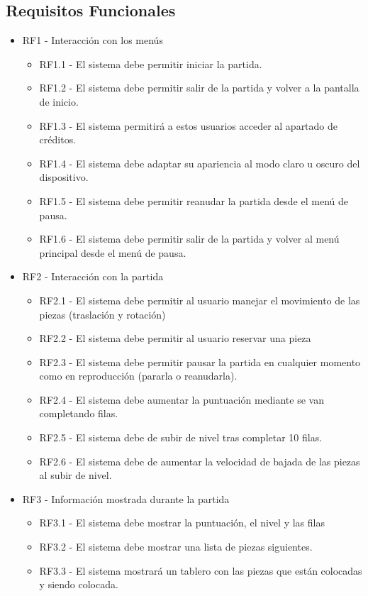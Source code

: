 \documentclass{article}
\begin{document}
\subsection {Requisitos Funcionales}
\begin{itemize}
    
    \item RF1 - Interacción con los menús  
    \begin{itemize}
      \item RF1.1 - El sistema debe permitir iniciar la partida.
      \item RF1.2 - El sistema debe permitir salir de la partida y volver a la pantalla de inicio.
      \item RF1.3 - El sistema permitirá a estos usuarios acceder al apartado de créditos. 
      \item RF1.4 - El sistema debe adaptar su apariencia al modo claro u oscuro del dispositivo.
      \item RF1.5 - El sistema debe permitir reanudar la partida desde el menú de pausa.
      \item RF1.6 - El sistema debe permitir salir de la partida y volver al menú principal desde el menú de pausa.
    \end{itemize}

    \item RF2 - Interacción con la partida
    \begin{itemize}
      \item RF2.1 - El sistema debe permitir al usuario manejar el movimiento de las
      piezas (traslación y rotación)
      \item RF2.2 - El sistema debe permitir al usuario reservar una pieza
      \item RF2.3 - El sistema debe permitir pausar la partida en cualquier momento como en reproducción (pararla o reanudarla).
      \item RF2.4 - El sistema debe aumentar la puntuación mediante se van completando filas.
      \item RF2.5 - El sistema debe de subir de nivel tras completar 10 filas.
      \item RF2.6 - El sistema debe de aumentar la velocidad de bajada de las piezas al subir de nivel.
    \end{itemize}

    \item RF3 - Información mostrada durante la partida
    \begin{itemize}
      \item RF3.1 - El sistema debe mostrar la puntuación, el nivel y las filas
      \item RF3.2 - El sistema debe mostrar una lista de piezas siguientes.
      \item RF3.3 - El sistema mostrará un tablero con las piezas que están colocadas y siendo colocada.
    \end{itemize}
    


\end{itemize}
\end{document}

